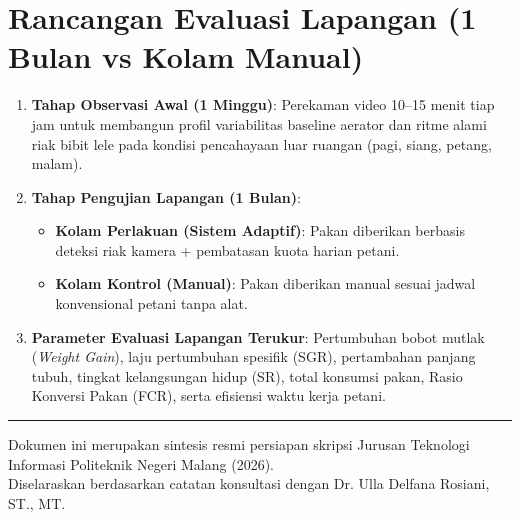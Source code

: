 \documentclass[10pt,a4paper]{article}
\begin{document}
\section{Rancangan Evaluasi Lapangan (1 Bulan vs Kolam Manual)}
{\small
\begin{enumerate}[leftmargin=*,itemsep=0pt,topsep=1pt,parsep=0pt]
    \item \textbf{Tahap Observasi Awal (1 Minggu)}: Perekaman video 10--15 menit tiap jam untuk membangun profil variabilitas baseline aerator dan ritme alami riak bibit lele pada kondisi pencahayaan luar ruangan (pagi, siang, petang, malam).
    \item \textbf{Tahap Pengujian Lapangan (1 Bulan)}:
    \begin{itemize}[itemsep=0pt,topsep=0pt,parsep=0pt]
        \item \textbf{Kolam Perlakuan (Sistem Adaptif)}: Pakan diberikan berbasis deteksi riak kamera + pembatasan kuota harian petani.
        \item \textbf{Kolam Kontrol (Manual)}: Pakan diberikan manual sesuai jadwal konvensional petani tanpa alat.
    \end{itemize}
    \item \textbf{Parameter Evaluasi Lapangan Terukur}:
    Pertumbuhan bobot mutlak (\textit{Weight Gain}), laju pertumbuhan spesifik (SGR), pertambahan panjang tubuh, tingkat kelangsungan hidup (SR), total konsumsi pakan, Rasio Konversi Pakan (FCR), serta efisiensi waktu kerja petani.
\end{enumerate}
}

\vspace{0.15cm}
\noindent\rule{\textwidth}{0.5pt}
\begin{center}
    \footnotesize\color{gray}
    Dokumen ini merupakan sintesis resmi persiapan skripsi Jurusan Teknologi Informasi Politeknik Negeri Malang (2026).\\
    Diselaraskan berdasarkan catatan konsultasi dengan Dr. Ulla Delfana Rosiani, ST., MT.
\end{center}
\end{document}
